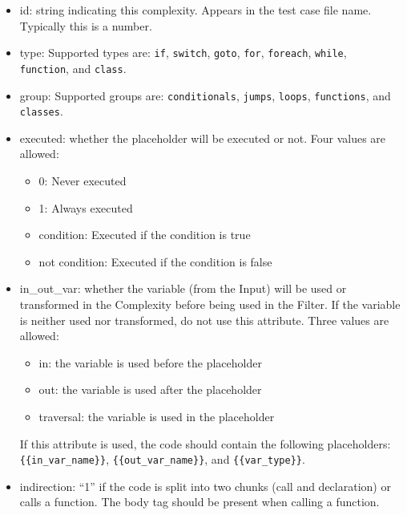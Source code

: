 \documentclass[12pt]{article}
\begin{document}
\begin{itemize}
    \item id: string indicating this complexity.  Appears in the test case
      file name.  Typically this is a number.

    \item type: Supported types are: \verb|if|, \verb|switch|, \verb|goto|, 
    \verb|for|, \verb|foreach|, \verb|while|, \\
    \verb|function|, and \verb|class|.

    \item group: Supported groups are: \verb|conditionals|, \verb|jumps|, 
    \verb|loops|, \verb|functions|, and \\ \verb|classes|.

    \item executed: whether the placeholder will be executed or not. Four 
    values are allowed:
    \begin{itemize}
        \item 0: Never executed
        \item 1: Always executed
        \item condition:  Executed if the condition is true
        \item not condition:  Executed if the condition is false
    \end{itemize}

    \item in\_out\_var: whether the variable (from the Input) will be used or
    transformed in the Complexity before being used in the Filter.  If the
    variable is neither used nor transformed, do not use this attribute.
    Three values are allowed:
    \begin{itemize}
        \item in: the variable is used before the placeholder 
        \item out: the variable is used after the placeholder
        \item traversal: the variable is used in the placeholder
    \end{itemize}
    If this attribute is used, the code should contain the following 
    placeholders: \\
    \verb|{{in_var_name}}|, \verb|{{out_var_name}}|, and \verb|{{var_type}}|.

    \item indirection: ``1'' if the code is split into two chunks (call and
    declaration) or calls a function.  The body tag should be present when 
    calling a function.


\end{itemize}
\end{document}
